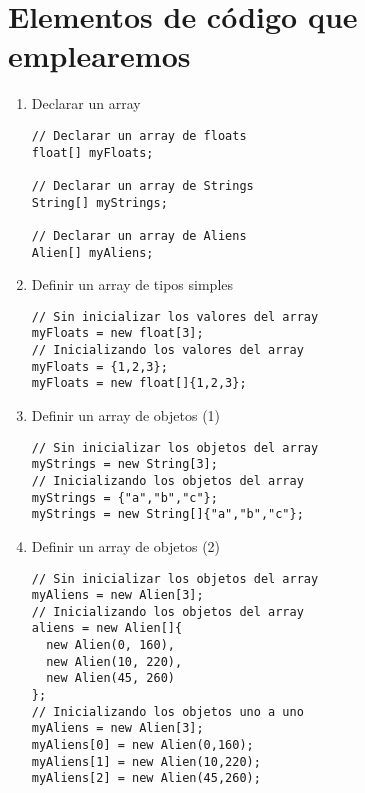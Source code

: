 \documentclass[a4paper,oneside]{article}
\begin{document}
\section{Elementos de código que emplearemos}
\begin{enumerate}

  \item Declarar un array

    \begin{verbatim}
// Declarar un array de floats
float[] myFloats;

// Declarar un array de Strings
String[] myStrings;

// Declarar un array de Aliens
Alien[] myAliens;
    \end{verbatim}

  \item Definir un array de tipos simples

    \begin{verbatim}
// Sin inicializar los valores del array
myFloats = new float[3];
// Inicializando los valores del array
myFloats = {1,2,3};
myFloats = new float[]{1,2,3};
    \end{verbatim}

  \item Definir un array de objetos (1)

    \begin{verbatim}
// Sin inicializar los objetos del array
myStrings = new String[3];
// Inicializando los objetos del array
myStrings = {"a","b","c"};
myStrings = new String[]{"a","b","c"};
    \end{verbatim}

  \item Definir un array de objetos (2)

    \begin{verbatim}
// Sin inicializar los objetos del array
myAliens = new Alien[3];
// Inicializando los objetos del array
aliens = new Alien[]{
  new Alien(0, 160),
  new Alien(10, 220),
  new Alien(45, 260)
};
// Inicializando los objetos uno a uno
myAliens = new Alien[3];
myAliens[0] = new Alien(0,160);
myAliens[1] = new Alien(10,220);
myAliens[2] = new Alien(45,260);
    \end{verbatim}

\end{enumerate}
\end{document}
